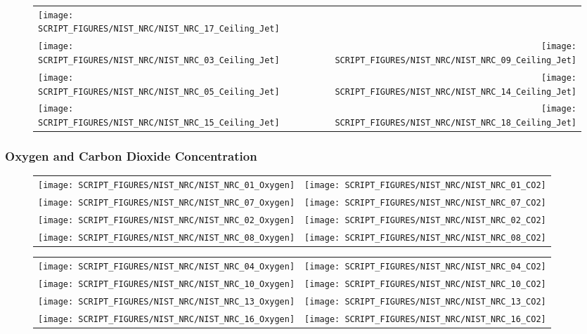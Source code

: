 \begin{figure}[!ht]
\begin{tabular*}{\textwidth}{l@{\extracolsep{\fill}}r}
\texttt{[image: SCRIPT\_FIGURES/NIST\_NRC/NIST\_NRC\_17\_Ceiling\_Jet]} &
 \\
\texttt{[image: SCRIPT\_FIGURES/NIST\_NRC/NIST\_NRC\_03\_Ceiling\_Jet]} &
\texttt{[image: SCRIPT\_FIGURES/NIST\_NRC/NIST\_NRC\_09\_Ceiling\_Jet]} \\
\texttt{[image: SCRIPT\_FIGURES/NIST\_NRC/NIST\_NRC\_05\_Ceiling\_Jet]} &
\texttt{[image: SCRIPT\_FIGURES/NIST\_NRC/NIST\_NRC\_14\_Ceiling\_Jet]} \\
\texttt{[image: SCRIPT\_FIGURES/NIST\_NRC/NIST\_NRC\_15\_Ceiling\_Jet]} &
\texttt{[image: SCRIPT\_FIGURES/NIST\_NRC/NIST\_NRC\_18\_Ceiling\_Jet]}
\end{tabular*}
\label{NIST_NRC_Jet_Open}
\end{figure}

\clearpage

\subsubsection{Oxygen and Carbon Dioxide Concentration}

\begin{figure}[!ht]
\begin{tabular*}{\textwidth}{l@{\extracolsep{\fill}}r}
\texttt{[image: SCRIPT\_FIGURES/NIST\_NRC/NIST\_NRC\_01\_Oxygen]} &
\texttt{[image: SCRIPT\_FIGURES/NIST\_NRC/NIST\_NRC\_01\_CO2]} \\
\texttt{[image: SCRIPT\_FIGURES/NIST\_NRC/NIST\_NRC\_07\_Oxygen]} &
\texttt{[image: SCRIPT\_FIGURES/NIST\_NRC/NIST\_NRC\_07\_CO2]} \\
\texttt{[image: SCRIPT\_FIGURES/NIST\_NRC/NIST\_NRC\_02\_Oxygen]} &
\texttt{[image: SCRIPT\_FIGURES/NIST\_NRC/NIST\_NRC\_02\_CO2]} \\
\texttt{[image: SCRIPT\_FIGURES/NIST\_NRC/NIST\_NRC\_08\_Oxygen]} &
\texttt{[image: SCRIPT\_FIGURES/NIST\_NRC/NIST\_NRC\_08\_CO2]}
\end{tabular*}
\end{figure}

\begin{figure}[!ht]
\begin{tabular*}{\textwidth}{l@{\extracolsep{\fill}}r}
\texttt{[image: SCRIPT\_FIGURES/NIST\_NRC/NIST\_NRC\_04\_Oxygen]} &
\texttt{[image: SCRIPT\_FIGURES/NIST\_NRC/NIST\_NRC\_04\_CO2]} \\
\texttt{[image: SCRIPT\_FIGURES/NIST\_NRC/NIST\_NRC\_10\_Oxygen]} &
\texttt{[image: SCRIPT\_FIGURES/NIST\_NRC/NIST\_NRC\_10\_CO2]} \\
\texttt{[image: SCRIPT\_FIGURES/NIST\_NRC/NIST\_NRC\_13\_Oxygen]} &
\texttt{[image: SCRIPT\_FIGURES/NIST\_NRC/NIST\_NRC\_13\_CO2]} \\
\texttt{[image: SCRIPT\_FIGURES/NIST\_NRC/NIST\_NRC\_16\_Oxygen]} &
\texttt{[image: SCRIPT\_FIGURES/NIST\_NRC/NIST\_NRC\_16\_CO2]}
\end{tabular*}\
\end{figure}

